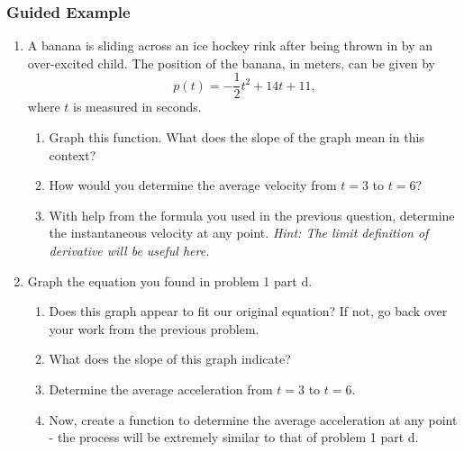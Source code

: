 \documentclass{ximera}
\begin{document}
\subsubsection{Guided Example}
\begin{enumerate}
\item {A banana is sliding across an ice hockey rink after being thrown in by an over-excited child. The position of the banana, in meters, can be given by $$p(t) = -\dfrac{1}{2}t^2+14t+11\text{,}$$ where $t$ is measured in seconds.}
\begin{enumerate}
\item{Graph this function. What does the slope of the graph mean in this context?}

\item{How would you determine the average velocity from $t = 3$ to $t = 6$?}
\item{With help from the formula you used in the previous question, determine the instantaneous velocity at any point. \textit{Hint: The limit definition of derivative will be useful here.}}
\end{enumerate}
\item{Graph the equation you found in problem 1 part d.}
\begin{enumerate}
\item{Does this graph appear to fit our original equation? If not, go back over your work from the previous problem.}
\item{What does the slope of this graph indicate?}
\item{Determine the average acceleration from $t = 3$ to $t = 6$.}
\item{Now, create a function to determine the average acceleration at any point - the process will be extremely similar to that of problem 1 part d.}
\end{enumerate}
\end{enumerate}
\end{document}
